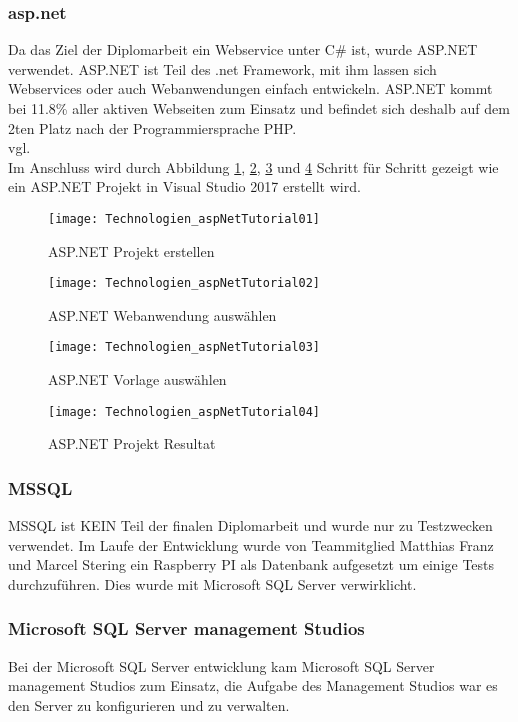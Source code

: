 \subsubsection {asp.net}
\label{sec:asp.net}
Da das Ziel der Diplomarbeit ein Webservice unter C\# ist, wurde ASP.NET verwendet. ASP.NET ist Teil des .net Framework, mit ihm lassen sich Webservices oder auch Webanwendungen einfach entwickeln. ASP.NET kommt bei 11.8\% aller aktiven Webseiten zum Einsatz und befindet sich deshalb auf dem 2ten Platz nach der Programmiersprache PHP. \\vgl. \cite{aspnetstatistik}
\\ Im Anschluss wird durch Abbildung \ref{fig:aspNetTut01}, \ref{fig:aspNetTut02}, \ref{fig:aspNetTut03} und \ref{fig:aspNetTut04} Schritt für Schritt gezeigt wie ein ASP.NET Projekt in Visual Studio 2017 erstellt wird.
\begin{figure}[h]
    \texttt{[image: Technologien\_aspNetTutorial01]}
    \caption{ASP.NET Projekt erstellen}
    \label{fig:aspNetTut01}
\end{figure}
\begin{figure}[h]
    \texttt{[image: Technologien\_aspNetTutorial02]}
    \caption{ASP.NET Webanwendung auswählen}
    \label{fig:aspNetTut02}
\end{figure}
\begin{figure}[H]
    \texttt{[image: Technologien\_aspNetTutorial03]}
    \caption{ASP.NET Vorlage auswählen}
    \label{fig:aspNetTut03}
\end{figure}
\begin{figure}[h]
    \texttt{[image: Technologien\_aspNetTutorial04]}
    \caption{ASP.NET Projekt Resultat}
    \label{fig:aspNetTut04}
\end{figure}
\subsubsection {MSSQL}
\label{sec:MSSQL}
MSSQL ist KEIN Teil der finalen Diplomarbeit und wurde nur zu Testzwecken verwendet. Im Laufe der Entwicklung wurde von Teammitglied Matthias Franz und Marcel Stering ein Raspberry PI als Datenbank aufgesetzt um einige Tests durchzuführen. Dies wurde mit Microsoft SQL Server verwirklicht. 
\subsubsection {Microsoft SQL Server management Studios}
\label{sec:mssql-server-management-studio}
Bei der Microsoft SQL Server entwicklung kam Microsoft SQL Server management Studios zum Einsatz, die Aufgabe des Management Studios war es den Server zu konfigurieren und zu verwalten. 
